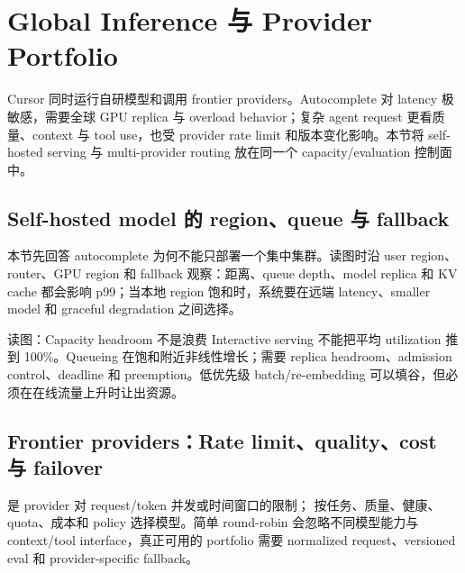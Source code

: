 \section{Global Inference 与 Provider Portfolio}

Cursor 同时运行自研模型和调用 frontier providers。Autocomplete 对 latency 极敏感，需要全球 GPU replica 与 overload behavior；复杂 agent request 更看质量、context 与 tool use，也受 provider rate limit 和版本变化影响。本节将 self-hosted serving 与 multi-provider routing 放在同一个 capacity/evaluation 控制面中。

\subsection{Self-hosted model 的 region、queue 与 fallback}

本节先回答 autocomplete 为何不能只部署一个集中集群。读图时沿 user region、router、GPU region 和 fallback 观察：距离、queue depth、model replica 和 KV cache 都会影响 p99；当本地 region 饱和时，系统要在远端 latency、smaller model 和 graceful degradation 之间选择。


\begin{knowledgebox}{读图：Capacity headroom 不是浪费}
Interactive serving 不能把平均 utilization 推到 100\%。Queueing 在饱和附近非线性增长；需要 replica headroom、admission control、deadline 和 preemption。低优先级 batch/re-embedding 可以填谷，但必须在在线流量上升时让出资源。
\end{knowledgebox}

\subsection{Frontier providers：Rate limit、quality、cost 与 failover}

 是 provider 对 request/token 并发或时间窗口的限制； 按任务、质量、健康、quota、成本和 policy 选择模型。简单 round-robin 会忽略不同模型能力与 context/tool interface，真正可用的 portfolio 需要 normalized request、versioned eval 和 provider-specific fallback。


